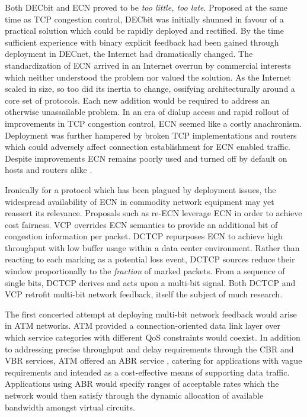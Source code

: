 Both DECbit and \ac{ECN} proved to be \emph{too little, too late}. 
Proposed at the same time as \ac{TCP} congestion control, DECbit was initially shunned in favour of a practical solution which could be rapidly deployed and rectified.
By the time sufficient experience with binary explicit feedback had been gained through deployment in DECnet, the Internet had dramatically changed.
The standardization of \ac{ECN} \cite{Ramakrishnan:2001p45} arrived in an Internet overrun by commercial interests which neither understood the problem nor valued the solution. 
As the Internet scaled in size, so too did its inertia to change, ossifying architecturally around a core set of protocols.
Each new addition would be required to address an otherwise unassailable problem.
In an era of dialup access and rapid rollout of improvements in \ac{TCP} congestion control, \ac{ECN} seemed like a costly anachronism.
Deployment was further hampered by broken \ac{TCP} implementations and routers which could adversely affect connection establishment for \ac{ECN} enabled traffic.
Despite improvements \cite{Kuzmanovic:2005p118} \ac{ECN} remains poorly used and turned off by default on hosts and routers alike \cite{Bauer:2011p482}.

Ironically for a protocol which has been plagued by deployment issues, the widespread availability of \ac{ECN} in commodity network equipment may yet reassert its relevance. 
Proposals such as re-ECN \cite{Briscoe:2005p346} leverage \ac{ECN} in order to achieve cost fairness.
\ac{VCP} \cite{YongXia:2008p121} overrides \ac{ECN} semantics to provide an additional bit of congestion information per packet.
\ac{DCTCP} \cite{Alizadeh:2010p356} repurposes \ac{ECN} to achieve high throughput with low buffer usage within a data center environment.
Rather than reacting to each marking as a potential loss event, \ac{DCTCP} sources reduce their window proportionally to the \emph{fraction} of marked packets.
From a sequence of single bits, \ac{DCTCP} derives and acts upon a multi-bit signal.
Both \ac{DCTCP} and \ac{VCP} retrofit multi-bit network feedback, itself the subject of much research.

The first concerted attempt at deploying multi-bit network feedback would arise in \ac{ATM} networks.
\ac{ATM} provided a connection-oriented data link layer over which service categories with different \ac{QoS} constraints would coexist.
In addition to addressing precise throughput and delay requirements through the \ac{CBR} and \ac{VBR} services, \ac{ATM} offered an \ac{ABR} service \cite{Bonomi:1995p481}, catering for applications with vague requirements and intended as a cost-effective means of supporting data traffic.
Applications using \ac{ABR} would specify ranges of acceptable rates which the network would then satisfy through the dynamic allocation of available bandwidth amongst virtual circuits.

